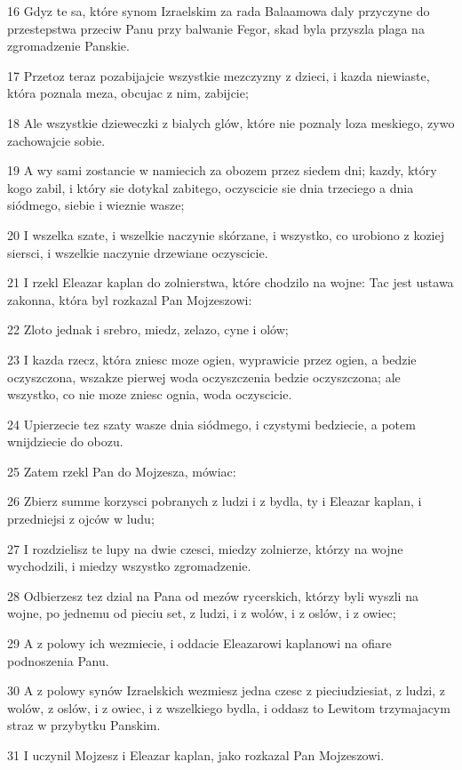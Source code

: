 \par 16 Gdyz te sa, które synom Izraelskim za rada Balaamowa daly przyczyne do przestepstwa przeciw Panu przy balwanie Fegor, skad byla przyszla plaga na zgromadzenie Panskie.
\par 17 Przetoz teraz pozabijajcie wszystkie mezczyzny z dzieci, i kazda niewiaste, która poznala meza, obcujac z nim, zabijcie;
\par 18 Ale wszystkie dzieweczki z bialych glów, które nie poznaly loza meskiego, zywo zachowajcie sobie.
\par 19 A wy sami zostancie w namiecich za obozem przez siedem dni; kazdy, który kogo zabil, i który sie dotykal zabitego, oczyscicie sie dnia trzeciego a dnia siódmego, siebie i wieznie wasze;
\par 20 I wszelka szate, i wszelkie naczynie skórzane, i wszystko, co urobiono z koziej siersci, i wszelkie naczynie drzewiane oczyscicie.
\par 21 I rzekl Eleazar kaplan do zolnierstwa, które chodzilo na wojne: Tac jest ustawa zakonna, która byl rozkazal Pan Mojzeszowi:
\par 22 Zloto jednak i srebro, miedz, zelazo, cyne i olów;
\par 23 I kazda rzecz, która zniesc moze ogien, wyprawicie przez ogien, a bedzie oczyszczona, wszakze pierwej woda oczyszczenia bedzie oczyszczona; ale wszystko, co nie moze zniesc ognia, woda oczyscicie.
\par 24 Upierzecie tez szaty wasze dnia siódmego, i czystymi bedziecie, a potem wnijdziecie do obozu.
\par 25 Zatem rzekl Pan do Mojzesza, mówiac:
\par 26 Zbierz summe korzysci pobranych z ludzi i z bydla, ty i Eleazar kaplan, i przedniejsi z ojców w ludu;
\par 27 I rozdzielisz te lupy na dwie czesci, miedzy zolnierze, którzy na wojne wychodzili, i miedzy wszystko zgromadzenie.
\par 28 Odbierzesz tez dzial na Pana od mezów rycerskich, którzy byli wyszli na wojne, po jednemu od pieciu set, z ludzi, i z wolów, i z oslów, i z owiec;
\par 29 A z polowy ich wezmiecie, i oddacie Eleazarowi kaplanowi na ofiare podnoszenia Panu.
\par 30 A z polowy synów Izraelskich wezmiesz jedna czesc z pieciudziesiat, z ludzi, z wolów, z oslów, i z owiec, i z wszelkiego bydla, i oddasz to Lewitom trzymajacym straz w przybytku Panskim.
\par 31 I uczynil Mojzesz i Eleazar kaplan, jako rozkazal Pan Mojzeszowi.
